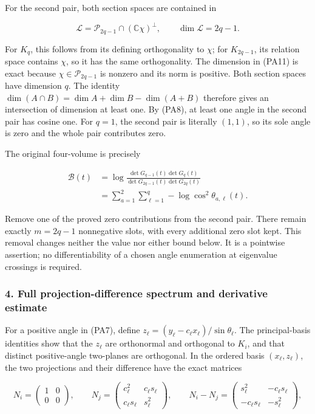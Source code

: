 \documentclass{article}
\begin{document}
For the second pair, both section spaces are contained in

\[
\mathcal L=\mathcal P_{2q-1}\cap(\mathbb C\chi)^\perp,
\qquad \dim\mathcal L=2q-1.
\tag{PA11}
\]

For \(K_q\), this follows from its defining orthogonality to \(\chi\); for \(K_{2q-1}\), its relation space contains \(\chi\), so it has the same orthogonality. The dimension in (PA11) is exact because \(\chi\in\mathcal P_{2q-1}\) is nonzero and its norm is positive. Both section spaces have dimension \(q\). The identity \(\dim(A\cap B)=\dim A+\dim B-\dim(A+B)\) therefore gives an intersection of dimension at least one. By (PA8), at least one angle in the second pair has cosine one. For \(q=1\), the second pair is literally \((1,1)\), so its sole angle is zero and the whole pair contributes zero.

The original four-volume is precisely

\[
\begin{aligned}
\mathcal B(t)
&=\log\frac{\det G_{q-1}(t)\det G_q(t)}
                {\det G_{2q-1}(t)\det G_{2q}(t)}\\
&=\sum_{a=1}^2\sum_{\ell=1}^q
          -\log\cos^2\theta_{a,\ell}(t).
\end{aligned}
\tag{PA12}
\]

Remove one of the proved zero contributions from the second pair. There remain exactly \(m=2q-1\) nonnegative slots, with every additional zero slot kept. This removal changes neither the value nor either bound below. It is a pointwise assertion; no differentiability of a chosen angle enumeration at eigenvalue crossings is required.

\subsubsection{4. Full projection-difference spectrum and derivative estimate}\label{endpoint-principal_angle_volume_review--full-projection-difference-spectrum-and-derivative-estimate}

For a positive angle in (PA7), define \(z_\ell=(y_\ell-c_\ell x_\ell)/\sin\theta_\ell\). The principal-basis identities show that the \(z_\ell\) are orthonormal and orthogonal to \(K_i\), and that distinct positive-angle two-planes are orthogonal. In the ordered basis \((x_\ell,z_\ell)\), the two projections and their difference have the exact matrices

\[
N_i=\begin{pmatrix}1&0\\0&0\end{pmatrix},\qquad
N_j=\begin{pmatrix}c_\ell^2&c_\ell s_\ell\\c_\ell s_\ell&s_\ell^2\end{pmatrix},
\qquad
N_i-N_j=
\begin{pmatrix}s_\ell^2&-c_\ell s_\ell\\-c_\ell s_\ell&-s_\ell^2\end{pmatrix},
\tag{PA13}
\]
\end{document}
